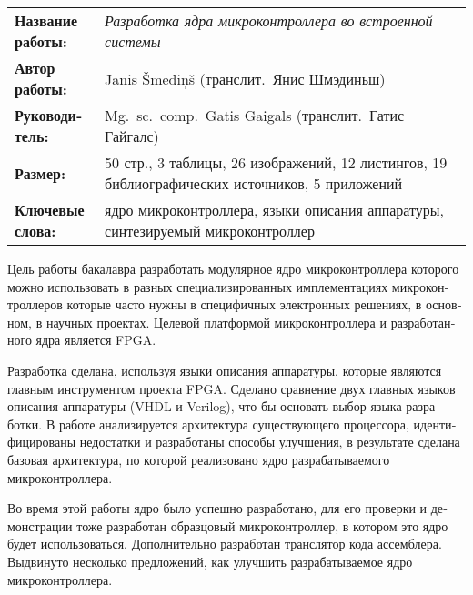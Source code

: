 \clearpage
\begin{russian} %
	\abstitlestyle{\abstractname} %
	\noindent%
	\begin{tabularx}{\textwidth}{lX}
		\textbf{Название работы:} & 
			\textit{Разработка ядра микроконтроллера во встроенной системы}\\[1ex]
		\textbf{Автор работы:} & Jānis Šmēdiņš (транслит.~Янис Шмэдиньш)\\[1ex]
		\textbf{Руководитель:} & Mg.~sc.~comp.~Gatis Gaigals 
			(транслит.~Гатис Гайгалс)\\[1ex]
		\textbf{Размер:} & 50 стр., 3 таблицы, 26 изображений,
			12 листингов, %
			19 библиографических источников, 5 приложений\\[1ex]
		\textbf{Ключевые слова:} & ядро микроконтроллера,
			языки описания аппаратуры, синтезируемый микроконтроллер
	\end{tabularx}
	
	\vspace{1em}
	Цель работы бакалавра разработать модулярное ядро микроконтроллера
	которого можно использовать в разных специализированных имплементациях
	микроконтроллеров которые часто нужны в специфичных электронных решениях,
	в основном, в научных проектах. Целевой платформой микроконтроллера и
	разработанного ядра является FPGA.

	Разработка сделана, используя языки описания аппаратуры, которые
	являются главным инструментом проекта FPGA. Сделано сравнение двух
	главных языков описания аппаратуры (VHDL и Verilog), что-бы основать
	выбор языка разработки. В работе анализируется архитектура существующего
	процессора, идентифицированы недостатки и разработаны способы улучшения,
	в результате сделана базовая архитектура, по которой реализовано
	ядро разрабатываемого микроконтроллера.

	Во время этой работы ядро было успешно разработано, для его
	проверки и демонстрации  тоже разработан образцовый микроконтроллер,
	в котором это ядро будет использоваться. Дополнительно разработан
	транслятор кода ассемблера. Выдвинуто несколько предложений,
	как улучшить разрабатываемое ядро микроконтроллера.
	
\end{russian}
